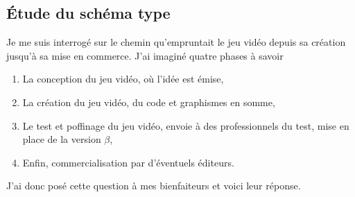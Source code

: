 \documentclass[12pt, a4paper]{report} %
\begin{document}
\subsection{Étude du schéma type}
\label{ssec::dev}
Je me suis interrogé sur le chemin qu'empruntait le jeu vidéo depuis sa création jusqu'à sa mise en commerce. J'ai imaginé quatre phases à savoir 
\begin{enumerate}
\item
  La conception du jeu vidéo, où l'idée est émise,
\item
  La création du jeu vidéo, du code et graphismes en somme,
\item
  Le test et poffinage du jeu vidéo, envoie à des professionnels du test, mise en place de la version $\beta $,
\item
  Enfin, commercialisation par d'éventuels éditeurs.
\end{enumerate}
J'ai donc posé cette question à mes bienfaiteurs et voici leur réponse.
\end{document}
